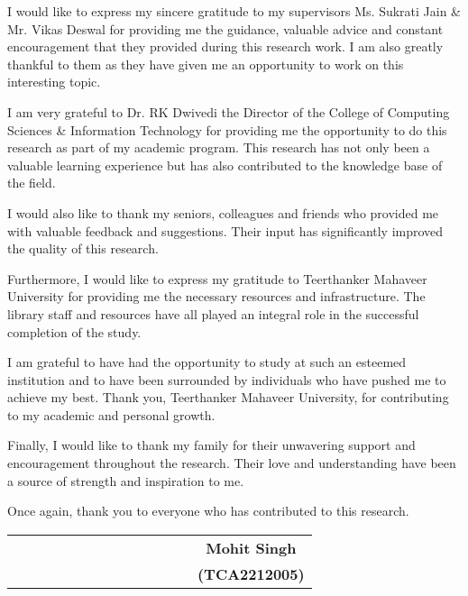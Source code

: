 I would like to express my sincere gratitude to my supervisors Ms. Sukrati Jain \& Mr. Vikas Deswal for providing me the guidance, valuable advice and constant encouragement that they provided during this research work. I am also greatly thankful to them as they have given me an opportunity to work on this interesting topic.

I am very grateful to Dr. RK Dwivedi the Director of the College of Computing Sciences \& Information Technology for providing me the opportunity to do this research as part of my academic program. This research has not only been a valuable learning experience but has also contributed to the knowledge base of the field.

I would also like to thank my seniors, colleagues and friends who provided me with valuable feedback and suggestions. Their input has significantly improved the quality of this research.

Furthermore, I would like to express my gratitude to Teerthanker Mahaveer University for providing me the necessary resources and infrastructure. The library staff and resources have all played an integral role in the successful completion of the study.

I am grateful to have had the opportunity to study at such an esteemed institution and to have been surrounded by individuals who have pushed me to achieve my best. Thank you, Teerthanker Mahaveer University, for contributing to my academic and personal growth.

Finally, I would like to thank my family for their unwavering support and encouragement throughout the research. Their love and understanding have been a source of strength and inspiration to me.

Once again, thank you to everyone who has contributed to this research.

\vspace{2\baselineskip}

\begin{center}
	\begin{tabular}{p{0.67\linewidth}c}
		&  \textbf{Mohit Singh} \\
		&  \textbf{(TCA2212005)}
	\end{tabular}
\end{center}
\clearpage